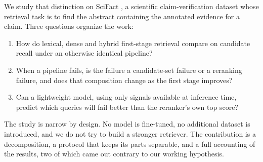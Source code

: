 \documentclass[11pt,a4paper]{article}
\begin{document}
We study that distinction on SciFact \citep{wadden2020scifact}, a scientific
claim-verification dataset whose retrieval task is to find the abstract containing the annotated
evidence for a claim. Three questions organize the work:

\begin{enumerate}
  \item How do lexical, dense and hybrid first-stage retrieval compare on candidate recall
        under an otherwise identical pipeline?
  \item When a pipeline fails, is the failure a candidate-set failure or a reranking failure,
        and does that composition change as the first stage improves?
  \item Can a lightweight model, using only signals available at inference time, predict which
        queries will fail better than the reranker's own top score?
\end{enumerate}

The study is narrow by design. No model is fine-tuned, no additional dataset is introduced, and
we do not try to build a stronger retriever. The contribution is a decomposition, a protocol
that keeps its parts separable, and a full accounting of the results, two of which came out
contrary to our working hypothesis.
\end{document}
